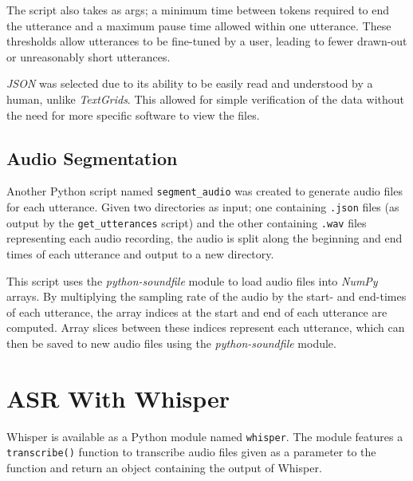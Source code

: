 The script also takes as args; a minimum time between tokens required to end the utterance and a maximum pause time allowed within one utterance.
These thresholds allow utterances to be fine-tuned by a user, leading to fewer drawn-out or unreasonably short utterances.

\emph{JSON} was selected due to its ability to be easily read and understood by a human, unlike \emph{TextGrids}.
This allowed for simple verification of the data without the need for more specific software to view the files.

\subsection{Audio Segmentation}

Another Python script named \texttt{segment\_audio} was created to generate audio files for each utterance. 
Given two directories as input; one containing \texttt{.json} files (as output by the \texttt{get\_utterances} script) and the other containing \texttt{.wav} files representing each audio recording, the audio is split along the beginning and end times of each utterance and output to a new directory.

This script uses the \emph{python-soundfile} module\cite{pysoundfile} to load audio files into \emph{NumPy}\cite{numpy} arrays.
By multiplying the sampling rate of the audio by the start- and end-times of each utterance, the array indices at the start and end of each utterance are computed.
Array slices between these indices represent each utterance, which can then be saved to new audio files using the \emph{python-soundfile} module.

\section{ASR With Whisper}

Whisper is available as a Python module named \texttt{whisper}\cite{pypi-whis}.
The module features a \texttt{transcribe()} function to transcribe audio files given as a parameter to the function and return an object containing the output of Whisper.


